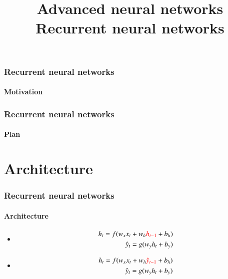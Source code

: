 \documentclass[xcolor=table]{beamer}
\title[ANN: RNN] %
{Advanced neural networks\\Recurrent neural networks}
\begin{document}
\begin{frame}
\frametitle{Recurrent neural networks}
\framesubtitle{Motivation}


\end{frame}

\begin{frame}
\frametitle{Recurrent neural networks}
\framesubtitle{Plan}

\begin{multicols}{2}
	\tableofcontents
\end{multicols}
\end{frame}

\section{Architecture}

\begin{frame}
\frametitle{Recurrent neural networks}
\framesubtitle{Architecture}

\begin{minipage}{0.49\textwidth} 
	\begin{itemize}
		\item {}
		\begin{align*}
		h_t = f(w_x x_t + w_h \textcolor{red}{h_{t-1}} + b_h) \\
		\hat{y}_t = g(w_y h_t + b_y)
		\end{align*}
		\item {}
		\begin{align*}
		h_t = f(w_x x_t + w_h \textcolor{red}{\hat{y}_{t-1}} + b_h) \\
		\hat{y}_t = g(w_y h_t + b_y)
		\end{align*}
	\end{itemize}
\end{minipage}
%
\begin{minipage}{0.5\textwidth}
\end{minipage}

\end{frame}
\end{document}
